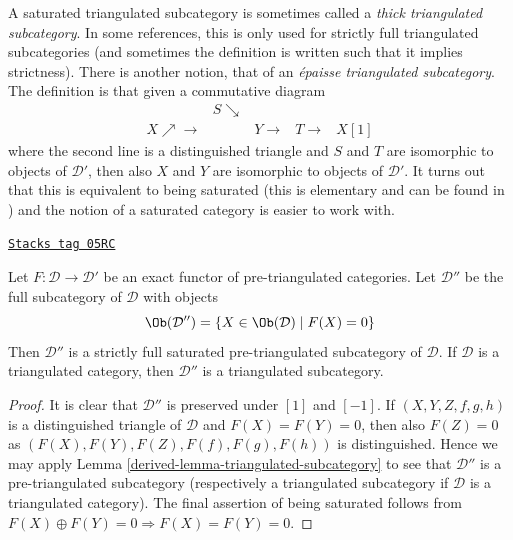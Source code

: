 A saturated triangulated subcategory is sometimes called a
{\it thick triangulated subcategory}. In some references, this is
only used for strictly full triangulated subcategories (and sometimes
the definition is written such that it implies strictness).
There is another notion, that of an {\it \'epaisse triangulated
subcategory}. The definition is that given a commutative diagram
$$
\begin{array}{ccccc} & S \searrow &  &  &  \\ X \nearrow\longrightarrow &  & Y \longrightarrow & T \longrightarrow & X[1]\end{array}
$$
where the second line is a distinguished triangle and $S$ and $T$ are isomorphic
to objects of $\mathcal{D}'$, then also $X$ and $Y$ are isomorphic to objects
of $\mathcal{D}'$. It turns out that this is equivalent to being
saturated (this is elementary and can be found in \cite{Rickard-derived})
and the notion of a saturated category is easier to work with.

\begin{lemma}
\label{derived-lemma-triangle-functor-kernel}
\href{https://stacks.math.columbia.edu/tag/05RC}{\texttt{Stacks tag 05RC}}

Let $F : \mathcal{D} \to \mathcal{D}'$ be an exact functor of
pre-triangulated categories. Let $\mathcal{D}''$ be the full subcategory
of $\mathcal{D}$ with objects
$$
\Ob(\mathcal{D}'') =
\{X \in \Ob(\mathcal{D}) \mid F(X) = 0\}
$$
Then $\mathcal{D}''$ is a strictly full saturated pre-triangulated
subcategory of $\mathcal{D}$. If $\mathcal{D}$ is a triangulated category,
then $\mathcal{D}''$ is a triangulated subcategory.
\end{lemma}

\begin{proof}

It is clear that $\mathcal{D}''$ is preserved under $[1]$ and $[-1]$.
If $(X, Y, Z, f, g, h)$ is a distinguished triangle of $\mathcal{D}$
and $F(X) = F(Y) = 0$, then also $F(Z) = 0$ as
$(F(X), F(Y), F(Z), F(f), F(g), F(h))$ is distinguished.
Hence we may apply
Lemma \ref{derived-lemma-triangulated-subcategory}
to see that $\mathcal{D}''$ is a pre-triangulated subcategory (respectively
a triangulated subcategory if $\mathcal{D}$ is a triangulated category).
The final assertion of being saturated follows from
$F(X) \oplus F(Y) = 0 \Rightarrow F(X) = F(Y) = 0$.
\end{proof}

